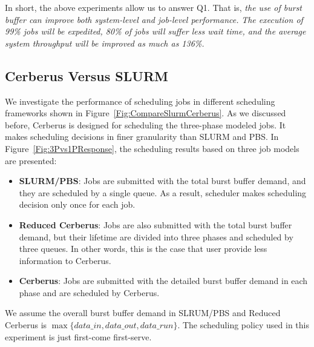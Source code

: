 In short, the above experiments allow us to answer Q1.
That is, \textit{the use of burst buffer can improve both system-level and job-level performance.}
\textit{The execution of 99\% jobs will be expedited, 
80\% of jobs will suffer less wait time,
and the average system throughput will be improved as much as 136\%.}


\subsection{Cerberus Versus SLURM}
\label{Sec:Sim:CerberusVsSlurm}
We investigate the performance of scheduling jobs in different scheduling frameworks shown in Figure~\ref{Fig:CompareSlurmCerberus}.
As we discussed before, Cerberus is designed for scheduling the three-phase modeled jobs. 
It makes scheduling decisions in finer granularity than SLURM and PBS.
In Figure~\ref{Fig:3Pvs1PResponse}, the scheduling results based on three job models
are presented:
\begin{itemize}
        \item \textbf{SLURM/PBS}: Jobs are submitted with the total burst buffer demand,
        and they are scheduled by a single queue.
	As a result, scheduler makes scheduling decision only once for each job.

        \item \textbf{Reduced Cerberus}: Jobs are also submitted with the total burst buffer demand,
        but their lifetime are divided into three phases and scheduled by three queues.
        In other words, this is the case that user provide less information to Cerberus.
        
        \item \textbf{Cerberus}: Jobs are submitted with the detailed burst buffer demand in each phase and are scheduled by Cerberus.

\end{itemize}
We assume the overall burst buffer demand in SLRUM/PBS and Reduced Cerberus is
$\max \{data\_in, data\_out, data\_run\}$.
The scheduling policy used in this experiment is just first-come first-serve.


